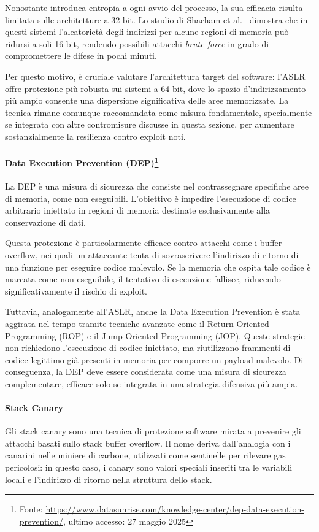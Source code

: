 Nonostante introduca entropia a ogni avvio del processo, la sua efficacia
risulta limitata sulle architetture a 32 bit. Lo studio di Shacham et al.~\cite{aslr_effectiveness}
dimostra che in questi sistemi l'aleatorietà degli indirizzi per alcune regioni
di memoria può ridursi a soli 16 bit, rendendo possibili attacchi \textit{brute-force}
in grado di compromettere le difese in pochi minuti.

Per questo motivo, è cruciale valutare l'architettura target del software: l'ASLR
offre protezione più robusta sui sistemi a 64 bit, dove lo spazio d'indirizzamento
più ampio consente una dispersione significativa delle aree memorizzate. La
tecnica rimane comunque raccomandata come misura fondamentale, specialmente se integrata
con altre contromisure discusse in questa sezione, per aumentare sostanzialmente
la resilienza contro exploit noti.

\paragraph{Data Execution Prevention (DEP)\protect\footnote{Fonte: \url{https://www.datasunrise.com/knowledge-center/dep-data-execution-prevention/},
ultimo accesso: 27 maggio 2025}}
La DEP è una misura di sicurezza che consiste nel contrassegnare specifiche aree
di memoria, come non eseguibili. L'obiettivo è impedire l'esecuzione di codice arbitrario
iniettato in regioni di memoria destinate esclusivamente alla conservazione di dati.

Questa protezione è particolarmente efficace contro attacchi come i buffer overflow,
nei quali un attaccante tenta di sovrascrivere l'indirizzo di ritorno di una
funzione per eseguire codice malevolo. Se la memoria che ospita tale codice è marcata
come non eseguibile, il tentativo di esecuzione fallisce, riducendo significativamente
il rischio di exploit.

Tuttavia, analogamente all'ASLR, anche la Data Execution Prevention è stata aggirata
nel tempo tramite tecniche avanzate come il Return Oriented Programming (ROP) e il
Jump Oriented Programming (JOP). Queste strategie non richiedono l'esecuzione di
codice iniettato, ma riutilizzano frammenti di codice legittimo già presenti in memoria
per comporre un payload malevolo. Di conseguenza, la DEP deve essere considerata
come una misura di sicurezza complementare, efficace solo se integrata in una
strategia difensiva più ampia.

\paragraph{Stack Canary}
Gli stack canary sono una tecnica di protezione software mirata a prevenire gli attacchi
basati sullo stack buffer overflow. Il nome deriva dall'analogia con i canarini
nelle miniere di carbone, utilizzati come sentinelle per rilevare gas pericolosi:
in questo caso, i canary sono valori speciali inseriti tra le variabili locali e
l'indirizzo di ritorno nella struttura dello stack.

